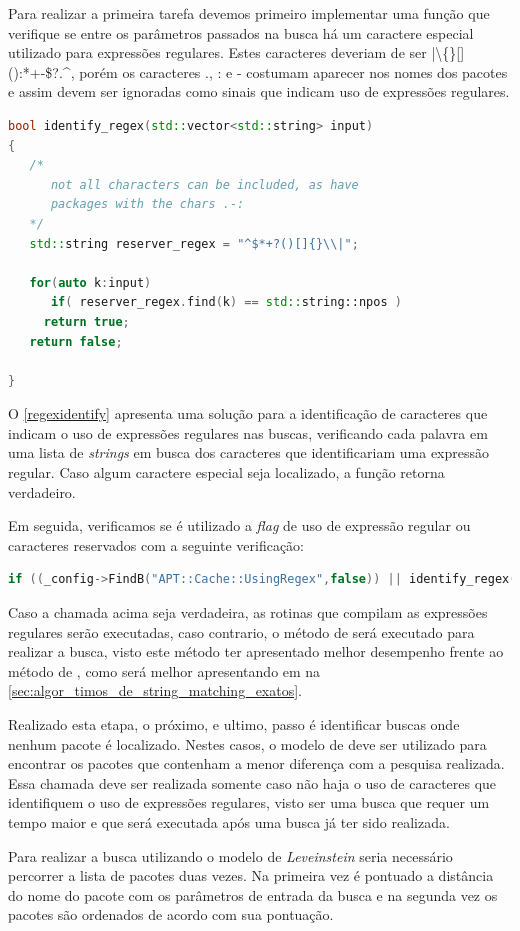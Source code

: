 Para realizar a primeira tarefa devemos primeiro implementar uma função que verifique se entre os parâmetros passados na busca há um caractere especial utilizado para expressões regulares. Estes caracteres deveriam de ser {\code |\textbackslash\{\}[]():*+-\$?.\^{}}, porém os caracteres {\code .}, {\code :} e {\code -} costumam aparecer nos nomes dos pacotes e assim devem ser ignoradas como sinais que indicam uso de expressões regulares.

\begin{lstlisting}[language=C++,label=regexidentify,caption={Identificação de Expressões Regulares}]
bool identify_regex(std::vector<std::string> input)
{
   /*
      not all characters can be included, as have
      packages with the chars .-:
   */
   std::string reserver_regex = "^$*+?()[]{}\\|";

   for(auto k:input)
      if( reserver_regex.find(k) == std::string::npos )
	 return true;
   return false;

}
\end{lstlisting}

O \autoref{regexidentify} apresenta uma solução para a identificação de caracteres que indicam o uso de expressões regulares nas buscas, verificando cada palavra em uma lista de \textit{strings} em busca dos caracteres que identificariam uma expressão regular. Caso algum caractere especial seja localizado, a função retorna verdadeiro.


Em seguida, verificamos se é utilizado a \textit{flag} de uso de expressão regular ou caracteres reservados com a seguinte verificação:

\begin{lstlisting}[language=C++,basicstyle=\footnotesize\ttfamily,numbers=none]
if ((_config->FindB("APT::Cache::UsingRegex",false)) || identify_regex(args))
\end{lstlisting}

Caso a chamada acima seja verdadeira, as rotinas que compilam as expressões regulares serão executadas, caso contrario, o método de  será executado para realizar a busca, visto este método ter apresentado melhor desempenho frente ao método de , como será melhor apresentando em  na \autoref{sec:algor_timos_de_string_matching_exatos}.


Realizado esta etapa, o próximo, e ultimo, passo é identificar buscas onde nenhum pacote é localizado. Nestes casos, o modelo de \textit{} deve ser utilizado para encontrar os pacotes que contenham a menor diferença com a pesquisa realizada. Essa chamada deve ser realizada somente caso não haja o uso de caracteres que identifiquem o uso de expressões regulares, visto ser uma busca que requer um tempo maior e que será executada após uma busca já ter sido realizada.

Para realizar a busca utilizando o modelo de \textit{Leveinstein} seria necessário percorrer a lista de pacotes duas vezes. Na primeira vez é pontuado a distância do nome do pacote com os parâmetros de entrada da busca e na segunda vez os pacotes são ordenados de acordo com sua pontuação.
